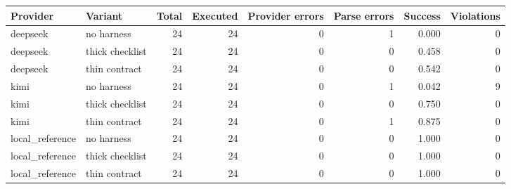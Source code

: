 \begin{tabular}{llrrrrrr}
\toprule
Provider & Variant & Total & Executed & Provider errors & Parse errors & Success & Violations \\
\midrule
deepseek & no harness & 24 & 24 & 0 & 1 & 0.000 & 0 \\
deepseek & thick checklist & 24 & 24 & 0 & 0 & 0.458 & 0 \\
deepseek & thin contract & 24 & 24 & 0 & 0 & 0.542 & 0 \\
kimi & no harness & 24 & 24 & 0 & 1 & 0.042 & 9 \\
kimi & thick checklist & 24 & 24 & 0 & 0 & 0.750 & 0 \\
kimi & thin contract & 24 & 24 & 0 & 1 & 0.875 & 0 \\
local\_reference & no harness & 24 & 24 & 0 & 0 & 1.000 & 0 \\
local\_reference & thick checklist & 24 & 24 & 0 & 0 & 1.000 & 0 \\
local\_reference & thin contract & 24 & 24 & 0 & 0 & 1.000 & 0 \\
\bottomrule
\end{tabular}
